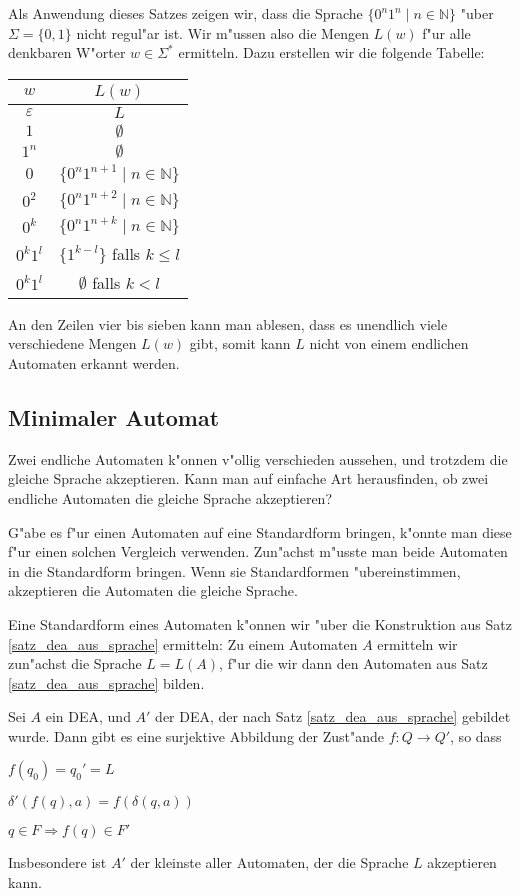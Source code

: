 Als Anwendung dieses Satzes zeigen wir, dass die Sprache
$\{ 0^n1^n \;|\; n\in\mathbb N\}$ "uber $\Sigma=\{0,1\}$
nicht regul"ar ist. Wir m"ussen also
die Mengen $L(w)$ f"ur alle denkbaren W"orter $w\in\Sigma^*$
ermitteln. Dazu erstellen wir die folgende Tabelle:
\begin{center}
\begin{tabular}{|c|c|}
\hline
$w$&$L(w)$\\
\hline
$\varepsilon$&$L$\\
$1$&$\emptyset$\\
$1^n$&$\emptyset$\\
$0$&$\{0^n1^{n+1}\;|\; n\in\mathbb N\}$\\
$0^2$&$\{0^n1^{n+2}\;|\; n\in\mathbb N\}$\\
$0^k$&$\{0^n1^{n+k}\;|\; n\in\mathbb N\}$\\
$0^k1^l$&$\{1^{k-l}\}$ falls $k\le l$\\
$0^k1^l$&$\emptyset $ falls $k<l$\\
\hline
\end{tabular}
\end{center}
An den Zeilen vier bis sieben kann man ablesen, dass es unendlich
viele verschiedene Mengen $L(w)$ gibt, somit kann $L$ nicht von
einem endlichen Automaten erkannt werden.

\subsection{Minimaler Automat}
Zwei endliche Automaten k"onnen v"ollig verschieden aussehen,
und trotzdem die gleiche Sprache akzeptieren. Kann man auf einfache
Art herausfinden, ob zwei endliche Automaten die gleiche Sprache
akzeptieren?

G"abe es f"ur einen Automaten auf eine Standardform bringen, k"onnte
man diese f"ur einen solchen Vergleich verwenden. Zun"achst m"usste
man beide Automaten in die Standardform bringen. Wenn sie Standardformen
"ubereinstimmen, akzeptieren die Automaten die gleiche Sprache.

Eine Standardform eines Automaten k"onnen wir "uber die Konstruktion
aus Satz \ref{satz_dea_aus_sprache} ermitteln: Zu einem Automaten
$A$ ermitteln wir zun"achst die Sprache $L=L(A)$, f"ur die wir dann
den Automaten aus Satz \ref{satz_dea_aus_sprache} bilden.

\begin{satz}[Minimalautomat]\label{satz_minimalautomat}
Sei $A$ ein DEA, und $A'$ der DEA, der nach
Satz \ref{satz_dea_aus_sprache} gebildet wurde. Dann gibt es
eine surjektive Abbildung der Zust"ande $f\colon Q\to Q'$, so dass
\begin{compactenum}
\item $f(q_0)=q_0'=L$
\item $\delta'(f(q),a)=f(\delta(q,a))$
\item $q\in F\Rightarrow f(q)\in F'$
\end{compactenum}
Insbesondere ist $A'$ der kleinste aller Automaten, der die Sprache
$L$ akzeptieren kann.
\end{satz}

